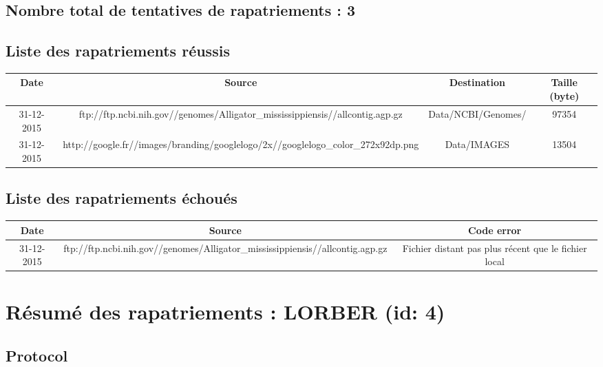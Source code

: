 \documentclass[a4paper,11pt,tikz]{article}
\begin{document}
  \subsection{Nombre total de tentatives de rapatriements : 3}
    
  \subsection{Liste des rapatriements réussis}
    \scalebox{0.7}
    {
      \begin{tabular}{|c|c|c|c|}
        \hline
        Date & Source & Destination & Taille (byte) \\
        \hline
            31-12-2015 & ftp://ftp.ncbi.nih.gov//genomes/Alligator\_mississippiensis//allcontig.agp.gz & Data/NCBI/Genomes/ & 97354 \\  31-12-2015 & http://google.fr//images/branding/googlelogo/2x//googlelogo\_color\_272x92dp.png & Data/IMAGES & 13504 \\ 
        \hline
      \end{tabular}
    }

  \subsection{Liste des rapatriements échoués}
    \scalebox{0.7}
    {
      \begin{tabular}{|c|c|c|}
        \hline
        Date & Source & Code error  \\
        \hline
           31-12-2015 & ftp://ftp.ncbi.nih.gov//genomes/Alligator\_mississippiensis//allcontig.agp.gz & Fichier distant pas plus récent que le fichier local \\ 
        \hline
      \end{tabular}
    }
\newpage


\section{Résumé des rapatriements : LORBER (id: 4)}
  \subsection{Protocol}
\end{document}
